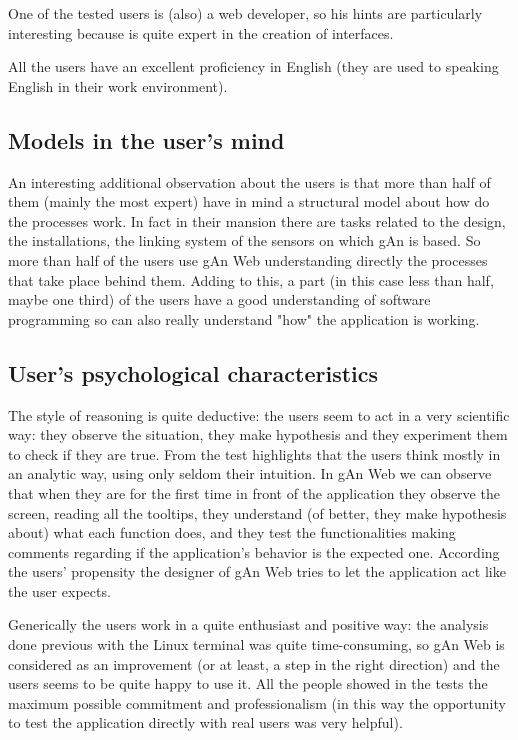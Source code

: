 One of the tested users is (also) a web developer, so his hints are particularly interesting because is quite expert in the creation of interfaces.
 
All the users have an excellent proficiency in English (they are used to speaking English in their work environment). 

\subsection{Models in the user's mind}
An interesting additional observation about the users is that more than half of them (mainly the most expert) have in mind a structural model about how do the processes work. In fact in their mansion there are tasks related to the design, the installations, the linking system of the sensors on which gAn is based. So more than half of the users use gAn Web understanding directly the processes that take place behind them. Adding to this, a part (in this case less than half, maybe one third) of the users have a good understanding of software programming so can also really understand "how" the application is working.

\subsection{User's psychological characteristics }
The style of reasoning is quite deductive: the users seem to act in a very scientific way: they observe the situation, they make hypothesis and they experiment them to check if they are true. From the test highlights that the users think mostly in an analytic way, using only seldom their intuition. In gAn Web we can observe that when they are for the first time in front of the application they observe the screen, reading all the tooltips, they understand (of better, they make hypothesis about) what each function does, and they test the functionalities making comments regarding if the application's behavior is the expected one. According the users' propensity the designer of gAn Web tries to let the application act like the user expects.   

Generically the users work in a quite enthusiast and positive way: the analysis done previous with the Linux terminal was quite time-consuming, so gAn Web is considered as an improvement (or at least, a step in the right direction) and the users seems to be quite happy to use it. All the people showed in the tests the maximum possible commitment and professionalism (in this way the opportunity to test the application directly with real users was very helpful).

